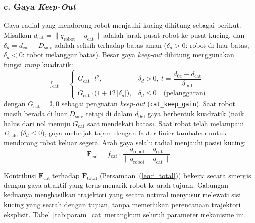\subsubsection*{c. Gaya \textit{Keep-Out}}

Gaya radial yang mendorong robot menjauhi kucing dihitung sebagai berikut. Misalkan $d_\text{cat} = \|q_\text{robot} - q_\text{cat}\|$ adalah jarak pusat robot ke pusat kucing, dan $\delta_d = d_\text{cat} - D_\text{safe}$ adalah selisih terhadap batas aman ($\delta_d > 0$: robot di luar batas, $\delta_d < 0$: robot melanggar batas). Besar gaya \textit{keep-out} dihitung menggunakan fungsi \textit{ramp} kuadratik:
\begin{equation}
    f_\text{cat} =
    \begin{cases}
        G_\text{cat} \cdot t^2, & \delta_d > 0,\ t = \dfrac{d_{0c} - d_\text{cat}}{\delta_\text{infl}} \\[6pt]
        G_\text{cat} \cdot \bigl(1 + 12\,|\delta_d|\bigr), & \delta_d \leq 0 \quad \text{(pelanggaran)}
    \end{cases}
    \label{eq:f_cat_scalar}
\end{equation}
dengan $G_\text{cat} = 3{,}0$ sebagai penguatan \textit{keep-out} (\texttt{cat\_keep\_gain}). Saat robot masih berada di luar $D_\text{safe}$ tetapi di dalam $d_{0c}$, gaya berbentuk kuadratik (naik halus dari nol menuju $G_\text{cat}$ saat mendekati batas). Saat robot telah melampaui $D_\text{safe}$ ($\delta_d \leq 0$), gaya melonjak tajam dengan faktor linier tambahan untuk mendorong robot keluar segera. Arah gaya selalu radial menjauhi posisi kucing:
\begin{equation}
    \mathbf{F}_\text{cat} = f_\text{cat} \cdot
    \frac{q_\text{robot} - q_\text{cat}}{\|q_\text{robot} - q_\text{cat}\|}
    \label{eq:f_cat_vector}
\end{equation}

Kontribusi $\mathbf{F}_\text{cat}$ terhadap $\mathbf{F}_\text{total}$ (Persamaan~(\ref{eq:f_total})) bekerja secara sinergis dengan gaya atraktif yang terus menarik robot ke arah tujuan. Gabungan keduanya menghasilkan trajektori yang secara natural menyusur melewati sisi kucing yang searah dengan tujuan, tanpa memerlukan perencanaan trajektori eksplisit. Tabel~\ref{tab:param_cat} merangkum seluruh parameter mekanisme ini.


